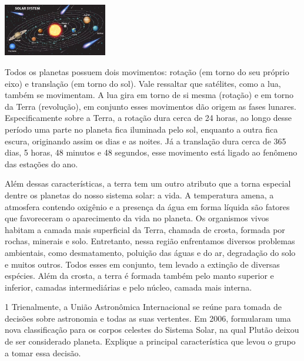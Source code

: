 {{{\includegraphics[width=1.78261in,height=0.90032in]{./imgs/img10.png}

Todos os planetas possuem dois movimentos: rotação (em torno do seu
próprio eixo) e translação (em torno do sol). Vale ressaltar que
satélites, como a lua, também se movimentam. A lua gira em torno de si
mesma (rotação) e em torno da Terra (revolução), em conjunto esses
movimentos dão origem as fases lunares. Especificamente sobre a Terra, a
rotação dura cerca de 24 horas, ao longo desse período uma parte no
planeta fica iluminada pelo sol, enquanto a outra fica escura,
originando assim os dias e as noites. Já a translação dura cerca de 365
dias, 5 horas, 48 minutos e 48 segundos, esse movimento está ligado ao
fenômeno das estações do ano.

Além dessas características, a terra tem um outro atributo que a torna
especial dentre os planetas do nosso sistema solar: a vida. A
temperatura amena, a atmosfera contendo oxigênio e a presença da água em
forma líquida são fatores que favoreceram o aparecimento da vida no
planeta. Os organismos vivos habitam a camada mais superficial da Terra,
chamada de crosta, formada por rochas, minerais e solo. Entretanto,
nessa região enfrentamos diversos problemas ambientais, como
desmatamento, poluição das águas e do ar, degradação do solo e muitos
outros. Todos esses em conjunto, tem levado a extinção de diversas
espécies. Além da crosta, a terra é formada também pelo manto superior e
inferior, camadas intermediárias e pelo núcleo, camada mais interna.}


\num{1}  Trienalmente, a União Astronômica Internacional se reúne para tomada
  de decisões sobre astronomia e todas as suas vertentes. Em 2006,
  formularam uma nova classificação para os corpos celestes do Sistema
  Solar, na qual Plutão deixou de ser considerado planeta. Explique a
  principal característica que levou o grupo a tomar essa decisão.



}}
